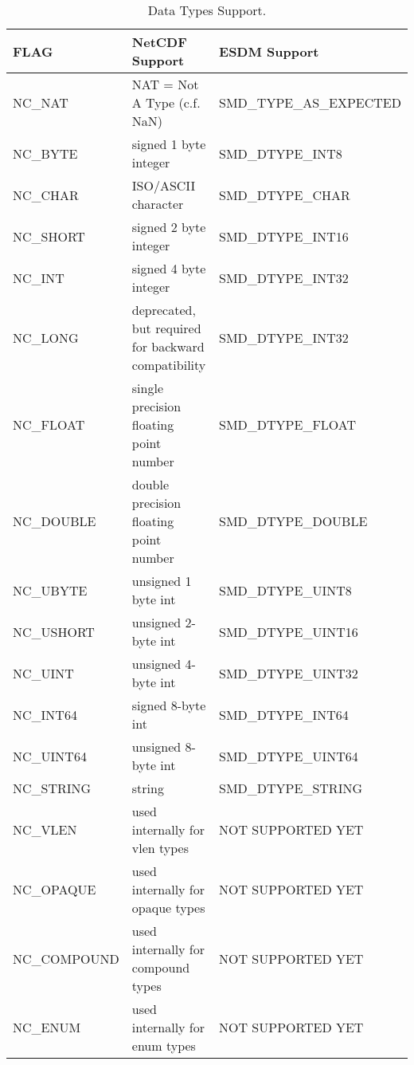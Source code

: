 \begin{table}[H]
\centering
\begin{tabular}{|l|m{6.4cm}|l|}
\hline
FLAG & NetCDF Support & ESDM Support \\ \hline \hline
NC\_NAT & NAT = Not A Type (c.f. NaN) &    SMD\_TYPE\_AS\_EXPECTED        \\ \hline
NC\_BYTE & signed 1 byte integer &     SMD\_DTYPE\_INT8        \\ \hline
NC\_CHAR & ISO/ASCII character &      SMD\_DTYPE\_CHAR       \\ \hline
NC\_SHORT & signed 2 byte integer &   SMD\_DTYPE\_INT16          \\ \hline
NC\_INT & signed 4 byte integer &     SMD\_DTYPE\_INT32        \\ \hline
NC\_LONG & deprecated, but required for backward compatibility &    SMD\_DTYPE\_INT32         \\ \hline
NC\_FLOAT & single precision floating point number &   SMD\_DTYPE\_FLOAT           \\ \hline
NC\_DOUBLE & double precision floating point number &   SMD\_DTYPE\_DOUBLE          \\ \hline
NC\_UBYTE & unsigned 1 byte int &     SMD\_DTYPE\_UINT8        \\ \hline
NC\_USHORT & unsigned 2-byte int &    SMD\_DTYPE\_UINT16         \\ \hline
NC\_UINT & unsigned 4-byte int &   SMD\_DTYPE\_UINT32          \\ \hline
NC\_INT64 & signed 8-byte int &    SMD\_DTYPE\_INT64         \\ \hline
NC\_UINT64 & unsigned 8-byte int &    SMD\_DTYPE\_UINT64         \\ \hline
NC\_STRING & string &    SMD\_DTYPE\_STRING         \\ \hline
NC\_VLEN & used internally for vlen types &      NOT SUPPORTED YET       \\ \hline
NC\_OPAQUE & used internally for opaque types &     NOT SUPPORTED YET        \\ \hline
NC\_COMPOUND & used internally for compound types &    NOT SUPPORTED YET         \\ \hline
NC\_ENUM & used internally for enum types &       NOT SUPPORTED YET      \\ \hline \hline
\end{tabular}
\caption{\label{datatypes-netcdf} Data Types Support.}
\end{table}

